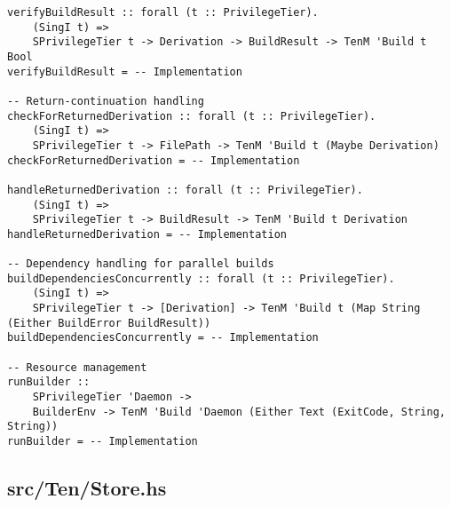 \documentclass{article}
\begin{document}
\begin{tcolorbox}[title=Ten/Build.hs Changes]
\begin{verbatim}
verifyBuildResult :: forall (t :: PrivilegeTier).
    (SingI t) =>
    SPrivilegeTier t -> Derivation -> BuildResult -> TenM 'Build t Bool
verifyBuildResult = -- Implementation

-- Return-continuation handling
checkForReturnedDerivation :: forall (t :: PrivilegeTier).
    (SingI t) =>
    SPrivilegeTier t -> FilePath -> TenM 'Build t (Maybe Derivation)
checkForReturnedDerivation = -- Implementation

handleReturnedDerivation :: forall (t :: PrivilegeTier).
    (SingI t) =>
    SPrivilegeTier t -> BuildResult -> TenM 'Build t Derivation
handleReturnedDerivation = -- Implementation

-- Dependency handling for parallel builds
buildDependenciesConcurrently :: forall (t :: PrivilegeTier).
    (SingI t) =>
    SPrivilegeTier t -> [Derivation] -> TenM 'Build t (Map String (Either BuildError BuildResult))
buildDependenciesConcurrently = -- Implementation

-- Resource management
runBuilder ::
    SPrivilegeTier 'Daemon ->
    BuilderEnv -> TenM 'Build 'Daemon (Either Text (ExitCode, String, String))
runBuilder = -- Implementation
\end{verbatim}
\end{tcolorbox}

\subsection{src/Ten/Store.hs}
\end{document}
